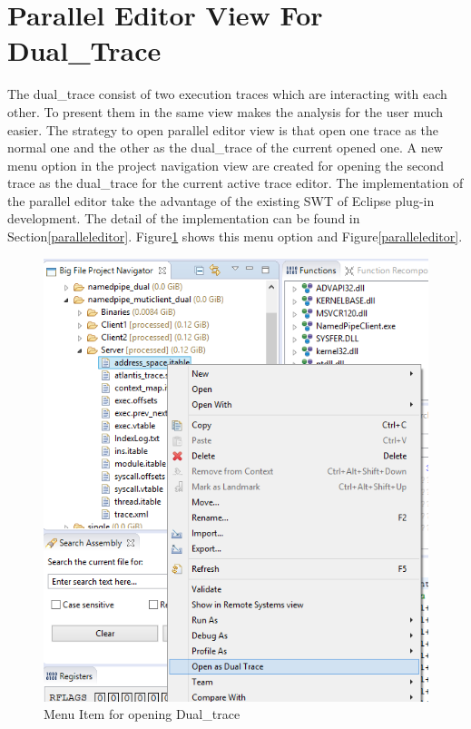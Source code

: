 \section{Parallel Editor View For Dual\_Trace}
The dual\_trace consist of two execution traces which are interacting with each other. To present them in the same view makes the analysis for the user much easier. The strategy to open parallel editor view is that open one trace as the normal one and the other as the dual\_trace of the current opened one. A new menu option in the project navigation view are created for opening the second trace as the dual\_trace for the current active trace editor. The implementation of the parallel editor take the advantage of the existing SWT of Eclipse plug-in development. The detail of the implementation can be found in Section\ref{paralleleditor}. Figure\ref{opendualtracemenu} shows this menu option and Figure\ref{paralleleditor}.

\begin{figure}[H]
\centerline{\includegraphics[scale=0.48]{Figures/opendualtracemenu}}
 \caption{Menu Item for opening Dual\_trace}
\label{opendualtracemenu}
\end{figure}

